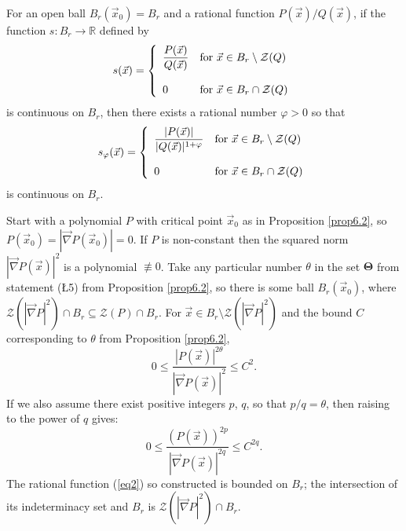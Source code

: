 \documentclass[10pt,a4paper]{amsart}
\newcommand{\re}{\mathbb{R}}
\newcommand{\vv}{\mathcal{Z}}
\begin{document}
\begin{lem}\label{lem3.3}
  For an open ball $B_r(\vec x_0)=B_r$ and a rational function $P(\vec x)/Q(\vec x)$, if the function $s:B_r\to\re$ defined by
  $$s(\vec x)=\left\{\begin{array}{ll}{\displaystyle{\frac{P(\vec x)}{Q(\vec x)}}} & \mbox{\rm{for} $\vec x\in B_r\setminus\vv(Q)$}\\ & \\0& \mbox{\rm{for} $\vec x\in B_r\cap\vv(Q)$} \end{array}\right.$$ is continuous on $B_r$,
%  
  then there exists a rational number $\varphi>0$ so that
    $$s_\varphi(\vec x)=\left\{\begin{array}{ll}{\displaystyle{\frac{|P(\vec x)|}{|Q(\vec x)|^{1+\varphi}}}} & \mbox{\rm{for} $\vec x\in B_r\setminus\vv(Q)$}\\ & \\0& \mbox{\rm{for} $\vec x\in B_r\cap\vv(Q)$} \end{array}\right.$$ is continuous on $B_r$.
%
\end{lem}

\begin{example}\label{ex3.2}
  Start with a polynomial $P$ with critical point $\vec x_0$ as in Proposition \ref{prop6.2}, so $P(\vec x_0)=|\vec\nabla P(\vec x_0)|=0$.  If $P$ is non-constant then the squared norm $|\vec\nabla P(\vec x)|^2$ is a polynomial $\not\equiv0$.  Take any particular number $\theta$ in the set $\mathbf\Theta$ from statement (\L5) from Proposition \ref{prop6.2}, so there is some ball $B_r(\vec x_0)$, where $\vv(|\vec\nabla P|^2)\cap B_r\subseteq\vv(P)\cap B_r$.  For $\vec x\in B_r\setminus\vv(|\vec\nabla P|^2)$ and the bound $C$ corresponding to $\theta$ from Proposition \ref{prop6.2},%
\begin{equation*}%
  0\le\frac{|P(\vec x)|^{2\theta}}{\left|\vec\nabla P(\vec x)\right|^2}\le C^2.
\end{equation*}
If we also assume there exist positive integers $p$, $q$, so that $p/q=\theta$, then raising to the power of $q$ gives:
\begin{equation}\label{eq2}
  0\le\frac{(P(\vec x))^{2p}}{\left|\vec\nabla P(\vec x)\right|^{2q}}\le C^{2q}.
\end{equation}
The rational function (\ref{eq2}) so constructed is bounded on $B_r$; the intersection of its indeterminacy set and $B_r$ is $\vv(|\vec\nabla P|^2)\cap B_r$.  
\end{example}
\end{document}
